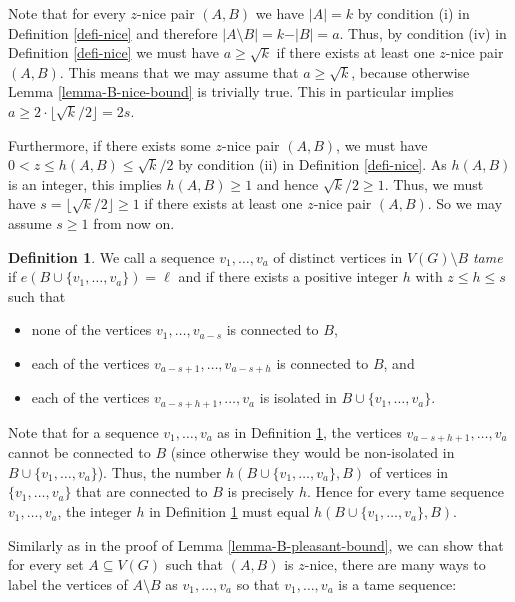 \documentclass[11pt]{article}
\theoremstyle{definition}
\newtheorem{definition}[theorem]{Definition}
\numberwithin{equation}{section}
\begin{document}
Note that for every $z$-nice pair $(A,B)$ we have $\vert A\vert=k$ by condition (i) in Definition \ref{defi-nice} and therefore $\vert A\setminus B\vert=k-\vert B\vert=a$. Thus, by condition (iv) in Definition \ref{defi-nice} we must have $a\geq \sqrt{k}$ if there exists at least one $z$-nice pair $(A,B)$. This means that we may assume that $a\geq \sqrt{k}$, because otherwise Lemma \ref{lemma-B-nice-bound} is trivially true. This in particular implies $a\geq 2\cdot\lfloor \sqrt{k}/2\rfloor=2s$.

Furthermore, if there exists some $z$-nice pair $(A,B)$, we must have $0<z\leq h(A,B)\leq \sqrt{k}/2$ by condition (ii) in Definition \ref{defi-nice}. As $h(A,B)$ is an integer, this implies $h(A,B)\geq 1$ and hence $\sqrt{k}/2\geq 1$. Thus, we must have $s=\lfloor \sqrt{k}/2\rfloor\geq 1$ if there exists at least one $z$-nice pair $(A,B)$. So we may assume $s\geq 1$ from now on.

\begin{definition}\label{defi-tame-sequence} We call a sequence $v_1,\dots,v_a$ of distinct vertices in $V(G)\setminus B$ \emph{tame} if $e(B\cup \lbrace v_1,\dots,v_a\rbrace)=\ell$ and if there exists a positive integer $h$ with $z\leq h\leq s$ such that
\begin{itemize}
\item none of the vertices $v_1,\dots,v_{a-s}$ is connected to $B$, 
\item each of the vertices $v_{a-s+1},\dots,v_{a-s+h}$ is connected to $B$, and
\item each of the vertices $v_{a-s+h+1},\dots,v_a$ is isolated in $B\cup \lbrace v_1,\dots,v_a\rbrace$.
\end{itemize}
\end{definition}

Note that for a sequence $v_1,\dots,v_a$ as in Definition \ref{defi-tame-sequence}, the vertices $v_{a-s+h+1},\dots,v_a$ cannot be connected to $B$ (since otherwise they would be non-isolated in $B\cup \lbrace v_1,\dots,v_a\rbrace$). Thus, the number $h(B\cup \lbrace v_1,\dots,v_a\rbrace, B)$ of vertices in $\lbrace v_1,\dots,v_a\rbrace$ that are connected to $B$ is precisely $h$. Hence for every tame sequence $v_1,\dots,v_a$, the integer $h$ in Definition \ref{defi-tame-sequence} must equal $h(B\cup \lbrace v_1,\dots,v_a\rbrace, B)$.

Similarly as in the proof of Lemma \ref{lemma-B-pleasant-bound}, we can show that for every set $A\subseteq V(G)$ such that $(A,B)$ is $z$-nice, there are many ways to label the vertices of $A\setminus B$ as $v_1,\dots,v_a$ so that $v_1,\dots,v_a$ is a tame sequence:
\end{document}
